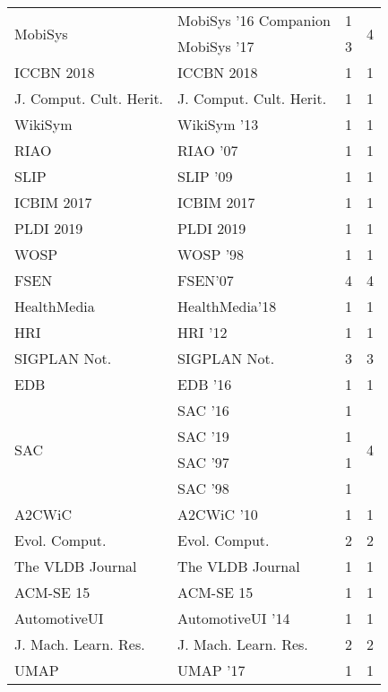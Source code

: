 \begin{table*}[t]
\begin{tabular}{llrr}
\multirow{2}{*}{MobiSys } & MobiSys '16 Companion & 1 & \multirow{2}{*}{4}\\
& MobiSys '17 & 3 &\\
\multirow{1}{*}{ICCBN 2018} & ICCBN 2018 & 1 & \multirow{1}{*}{1}\\
\multirow{1}{*}{J. Comput. Cult. Herit.} & J. Comput. Cult. Herit. & 1 & \multirow{1}{*}{1}\\
\multirow{1}{*}{WikiSym } & WikiSym '13 & 1 & \multirow{1}{*}{1}\\
\multirow{1}{*}{RIAO } & RIAO '07 & 1 & \multirow{1}{*}{1}\\
\multirow{1}{*}{SLIP } & SLIP '09 & 1 & \multirow{1}{*}{1}\\
\multirow{1}{*}{ICBIM 2017} & ICBIM 2017 & 1 & \multirow{1}{*}{1}\\
\multirow{1}{*}{PLDI 2019} & PLDI 2019 & 1 & \multirow{1}{*}{1}\\
\multirow{1}{*}{WOSP } & WOSP '98 & 1 & \multirow{1}{*}{1}\\
\multirow{1}{*}{FSEN} & FSEN'07 & 4 & \multirow{1}{*}{4}\\
\multirow{1}{*}{HealthMedia} & HealthMedia'18 & 1 & \multirow{1}{*}{1}\\
\multirow{1}{*}{HRI } & HRI '12 & 1 & \multirow{1}{*}{1}\\
\multirow{1}{*}{SIGPLAN Not.} & SIGPLAN Not. & 3 & \multirow{1}{*}{3}\\
\multirow{1}{*}{EDB } & EDB '16 & 1 & \multirow{1}{*}{1}\\
\multirow{4}{*}{SAC } & SAC '16 & 1 & \multirow{4}{*}{4}\\
& SAC '19 & 1 &\\
& SAC '97 & 1 &\\
& SAC '98 & 1 &\\
\multirow{1}{*}{A2CWiC } & A2CWiC '10 & 1 & \multirow{1}{*}{1}\\
\multirow{1}{*}{Evol. Comput.} & Evol. Comput. & 2 & \multirow{1}{*}{2}\\
\multirow{1}{*}{The VLDB Journal} & The VLDB Journal & 1 & \multirow{1}{*}{1}\\
\multirow{1}{*}{ACM-SE 15} & ACM-SE 15 & 1 & \multirow{1}{*}{1}\\
\multirow{1}{*}{AutomotiveUI } & AutomotiveUI '14 & 1 & \multirow{1}{*}{1}\\
\multirow{1}{*}{J. Mach. Learn. Res.} & J. Mach. Learn. Res. & 2 & \multirow{1}{*}{2}\\
\multirow{1}{*}{UMAP } & UMAP '17 & 1 & \multirow{1}{*}{1}\\

\end{tabular}
\end{table*}
